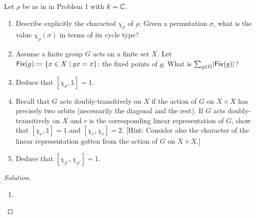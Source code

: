 \newpage



\begin{problem}
Let $\rho$ be as in in Problem 1 with $k = \mathbb{C}$. 
\begin{enumerate}[font=\normalfont,label=\textbf{(\alph*)}]

\item Describe explicitly the characted $\chi_\rho$ of $\rho$: Given a permutation $\sigma$, what is the value $\chi_\rho(\sigma)$ in terms of its cycle type?

\item Assume a finite group $G$ acts on a finite set $X$. Let $\mathsf{Fix} (g) \coloneqq \{x\in X\mid gx = x\}$; the fixed points of $g$. What is $\sum_{g\in G}\lvert \mathsf{Fix}(g)\rvert$?

\item Deduce that $[\chi_\rho, \mathbb{1}] = 1$. 
\item Recall that $G$ acts doubly-transitively on $X$ if the action of $G$ on $X \times X$ has precisely two orbits (necessarily the diagonal and the rest). If $G$ acts doubly-transitively on $X$ and $r$ is the corresponding linear representation of $G$, show that $[\chi_r, \mathbb{1}] = 1 $ and $[\chi_r, \chi_r] = 2$. [Hint: Consider also the character of the linear representation gotten from the action of $G$ on $X\times X$.]

\item Deduce that $[\chi_{\rho'}, \chi_{\rho'}] =1$. 
\end{enumerate}
\end{problem}

\begin{proof}[Solution]
\hfill
\begin{enumerate}[font=\normalfont,label=\textbf{(\alph*)}, wide]
\item
\end{enumerate}
\end{proof}

\newpage



